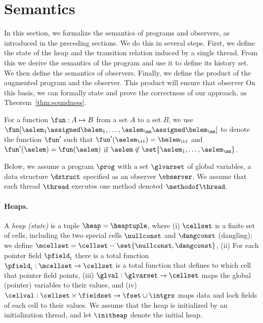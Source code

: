 \section{Semantics}
\label{semantics:section}
In this section, we formalize the semantics of programs and
observers, as introduced in the preceding sections.
%
We do this in several steps.
%
First, we define the state of the heap and the transition
relation induced by a single thread.
%
From this we derive the semantics of the program and use it to
define its history set.
%
We then define the semantics of observers.
Finally, we define the product of the augmented program and the observer.
This product will ensure that observer
On this basis, we can formally state and prove the correctness of
our approach, as Theorem~\ref{thm:soundness}.
%

For a function $\fun:A\mapsto B$ from a set $A$ to
a set $B$, we use 
$\fun[\aelem_1\assigned\belem_1,\ldots,\aelem_\nn\assigned\belem_\nn]$ 
to denote the function
$\fun'$ such that $\fun'(\aelem_\ii)=\belem_\ii$ and 
$\fun'(\aelem)=\fun(\aelem)$ if 
$\aelem\not\in\set{\aelem_1,\ldots,\aelem_\nn}$.
%

Below, we assume a program $\prog$  with a set 
$\glvarset$ of global variables,
a data structure $\dstruct$ specified as an observer $\observer$.
%
We assume that each thread $\thread$ executes one method
denoted $\methodof\thread$.
%


\paragraph{Heaps.}
A {\it heap (state)} is a tuple $\heap=\heaptuple$, where
(i)
$\cellset$ is a finite set of cells, including the two special cells
$\nullconst$ and $\dangconst$ (dangling);
%
we define $\mcellset=\cellset-\set{\nullconst,\dangconst}$,
%
(ii)
For each pointer field $\pfield_i$ there is a total function
$\pfield_i:\mcellset\to\cellset$ is a total
function that defines to which cell that pointer field points,
(iii)
$\glval:\glvarset\to\cellset$ maps the global (pointer)
variables to their values, and
(iv)
$\cellval:\cellset\times\fieldset\to\fset\cup\intgrs$
maps data and lock fields of each cell to their values.
%
We assume that the heap is initialized by
an initialization thread, and let $\initheap$ denote the initial
heap.

